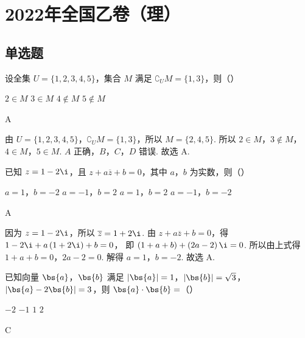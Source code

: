 \chapter{2022年全国乙卷（理）}

\section{单选题}

\begin{problem}
设全集 \(U=\{1,2,3,4,5\}\)，集合 \(M\) 满足 \(\complement_U M=\{1,3\}\)，则（\quad）

\choices
    {\(2\in M\)}
    {\(3\in M\)}
    {\(4\notin M\)}
    {\(5\notin M\)}
\end{problem}

\begin{answer}
A
\end{answer}

\begin{solution}
由 \(U=\{1,2,3,4,5\}\)，\(\complement_U M=\{1,3\}\)，所以 \(M=\{2,4,5\}\).
所以 \(2\in M\)，\(3\notin M\)，\(4\in M\)，\(5\in M\).
\(A\) 正确，\(B\)，\(C\)，\(D\) 错误.
故选 A.
\end{solution}

\begin{problem}
已知 \(z=1-2\i\)，且 \(z+a\overline z+b=0\)，其中 \(a\)，\(b\) 为实数，则（\quad）

\choices
    {\(a=1\)，\(b=-2\)}
    {\(a=-1\)，\(b=2\)}
    {\(a=1\)，\(b=2\)}
    {\(a=-1\)，\(b=-2\)}
\end{problem}

\begin{answer}
A
\end{answer}

\begin{solution}
因为 \(z=1-2\i\)，所以 \(\overline z=1+2\i\).
由 \(z+a\overline z+b=0\)，得
\(1-2\i+a\left( 1+2\i \right)+b=0\)，
即
\(\left( 1+a+b \right)+\left( 2a-2 \right)\i=0\).
所以由上式得 \(1+a+b=0\)，\(2a-2=0\).
解得 \(a=1\)，\(b=-2\).
故选 A.
\end{solution}

\begin{problem}
已知向量 \(\bs{a}\)，\(\bs{b}\) 满足 \(|\bs{a}|=1\)，\(|\bs{b}|=\sqrt{3}\)，\(|\bs{a}-2\bs{b}|=3\)，则 \(\bs{a}\cdot\bs{b}=\)（\quad）

\choices
    {\(-2\)}
    {\(-1\)}
    {\(1\)}
    {\(2\)}
\end{problem}

\begin{answer}
C
\end{answer}


